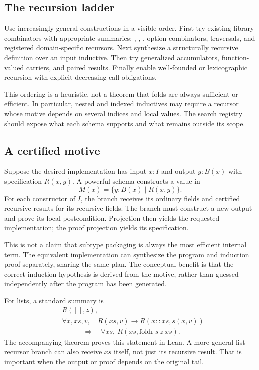 \documentclass[11pt,letterpaper]{article}
\newcommand{\code}[1]{\texttt{\detokenize{#1}}}
\theoremstyle{definition}
\theoremstyle{remark}
\begin{document}
\subsection{The recursion ladder}

Use increasingly general constructions in a visible order. First try existing library combinators with appropriate summaries: \code{map}, \code{foldr}, \code{foldl}, option combinators, traversals, and registered domain-specific recursors. Next synthesize a structurally recursive definition over an input inductive. Then try generalized accumulators, function-valued carriers, and paired results. Finally enable well-founded or lexicographic recursion with explicit decreasing-call obligations.

This ordering is a heuristic, not a theorem that folds are always sufficient or efficient. In particular, nested and indexed inductives may require a recursor whose motive depends on several indices and local values. The search registry should expose what each schema supports and what remains outside its scope.

\subsection{A certified motive}

Suppose the desired implementation has input $x:I$ and output $y:B(x)$ with specification $R(x,y)$. A powerful schema constructs a value in
\begin{equation}
 M(x)=\{y:B(x)\mid R(x,y)\}.
 \label{eq:certifiedmotive}
\end{equation}
For each constructor of $I$, the branch receives its ordinary fields and certified recursive results for its recursive fields. The branch must construct a new output and prove its local postcondition. Projection then yields the requested implementation; the proof projection yields its specification.

This is not a claim that subtype packaging is always the most efficient internal term. The equivalent implementation can synthesize the program and induction proof separately, sharing the same plan. The conceptual benefit is that the correct induction hypothesis is derived from the motive, rather than guessed independently after the program has been generated.

For lists, a standard summary is
\begin{align*}
 &R([],z),\\
 &\forall x,xs,v,\quad R(xs,v)\to R(x::xs,s(x,v))\\
 &\hspace{3em}\Longrightarrow\quad
 \forall xs,\ R(xs,\mathrm{foldr}\ s\ z\ xs).
\end{align*}
The accompanying \code{fold_contract} theorem proves this statement in Lean. A more general list recursor branch can also receive $xs$ itself, not just its recursive result. That is important when the output or proof depends on the original tail.
\end{document}
